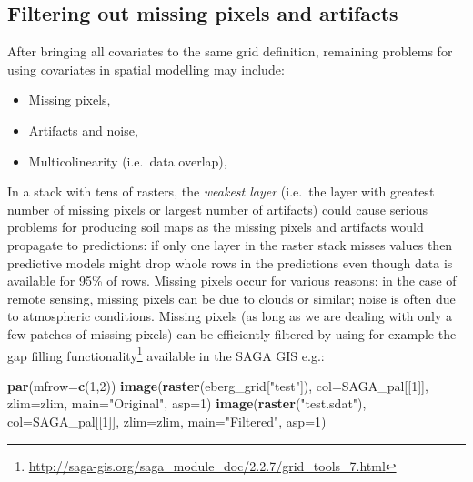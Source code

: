 \documentclass[11pt]{krantz}
\newenvironment{Shaded}{\begin{snugshade}}{\end{snugshade}}
\newcommand{\DataTypeTok}[1]{\textcolor[rgb]{0.27,0.27,0.27}{#1}}
\newcommand{\DecValTok}[1]{\textcolor[rgb]{0.06,0.06,0.06}{#1}}
\newcommand{\KeywordTok}[1]{\textcolor[rgb]{0.27,0.27,0.27}{\textbf{#1}}}
\newcommand{\NormalTok}[1]{#1}
\newcommand{\StringTok}[1]{\textcolor[rgb]{0.5,0.5,0.5}{#1}}
\renewcommand{\href}[2]{#2\footnote{\url{#1}}}
\theoremstyle{definition}
\theoremstyle{definition}
\theoremstyle{definition}
\theoremstyle{remark}
\begin{document}
\hypertarget{filtering-out-missing-pixels-and-artifacts}{%
\subsection{Filtering out missing pixels and
artifacts}\label{filtering-out-missing-pixels-and-artifacts}}

After bringing all covariates to the same grid definition, remaining
problems for using covariates in spatial modelling may include:

\begin{itemize}
\item
  Missing pixels,
\item
  Artifacts and noise,
\item
  Multicolinearity (i.e.~data overlap),
\end{itemize}

In a stack with tens of rasters, the \emph{weakest layer} (i.e.~the
layer with greatest number of missing pixels or largest number of
artifacts) could cause serious problems for producing soil maps as the
missing pixels and artifacts would propagate to predictions: if only one
layer in the raster stack misses values then predictive models might
drop whole rows in the predictions even though data is available for
95\% of rows. Missing pixels occur for various reasons: in the case of
remote sensing, missing pixels can be due to clouds or similar; noise is
often due to atmospheric conditions. Missing pixels (as long as we are
dealing with only a few patches of missing pixels) can be efficiently
filtered by using for example the
\href{http://saga-gis.org/saga_module_doc/2.2.7/grid_tools_7.html}{gap
filling functionality} available in the SAGA GIS e.g.:

\begin{Shaded}
\begin{Highlighting}[]
\KeywordTok{par}\NormalTok{(}\DataTypeTok{mfrow=}\KeywordTok{c}\NormalTok{(}\DecValTok{1}\NormalTok{,}\DecValTok{2}\NormalTok{))}
\KeywordTok{image}\NormalTok{(}\KeywordTok{raster}\NormalTok{(eberg_grid[}\StringTok{"test"}\NormalTok{]), }\DataTypeTok{col=}\NormalTok{SAGA_pal[[}\DecValTok{1}\NormalTok{]], }\DataTypeTok{zlim=}\NormalTok{zlim, }\DataTypeTok{main=}\StringTok{"Original"}\NormalTok{, }\DataTypeTok{asp=}\DecValTok{1}\NormalTok{)}
\KeywordTok{image}\NormalTok{(}\KeywordTok{raster}\NormalTok{(}\StringTok{"test.sdat"}\NormalTok{), }\DataTypeTok{col=}\NormalTok{SAGA_pal[[}\DecValTok{1}\NormalTok{]], }\DataTypeTok{zlim=}\NormalTok{zlim, }\DataTypeTok{main=}\StringTok{"Filtered"}\NormalTok{, }\DataTypeTok{asp=}\DecValTok{1}\NormalTok{)}
\end{Highlighting}
\end{Shaded}
\end{document}
